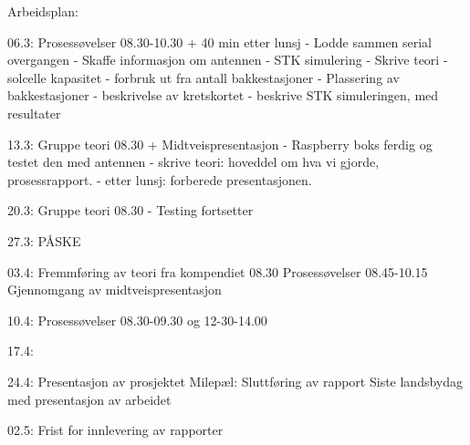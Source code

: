 
Arbeidsplan:

06.3:	
		Prosessøvelser 08.30-10.30 + 40 min etter lunsj
		- Lodde sammen serial overgangen
		- Skaffe informasjon om antennen 
		- STK simulering
		- Skrive teori 
			- solcelle kapasitet
			- forbruk ut fra antall bakkestasjoner
			- Plassering av bakkestasjoner
			- beskrivelse av kretskortet
			- beskrive STK simuleringen, med resultater

13.3:	Gruppe teori 08.30 + Midtveispresentasjon
		- Raspberry boks ferdig og testet den med antennen
		- skrive teori: hoveddel om hva vi gjorde, prosessrapport.
		- etter lunsj: forberede presentasjonen.

20.3:   	Gruppe teori 08.30
		- Testing fortsetter

27.3: 	PÅSKE

03.4: 	Fremmføring av teori fra kompendiet 08.30
		Prosessøvelser 08.45-10.15
		Gjennomgang av midtveispresentasjon
		
10.4:	Prosessøvelser 08.30-09.30 og 12-30-14.00

17.4: 	

24.4:	Presentasjon av prosjektet
		Milepæl: Sluttføring av rapport 
		Siste landsbydag med presentasjon av arbeidet

02.5:	Frist for innlevering av rapporter	

